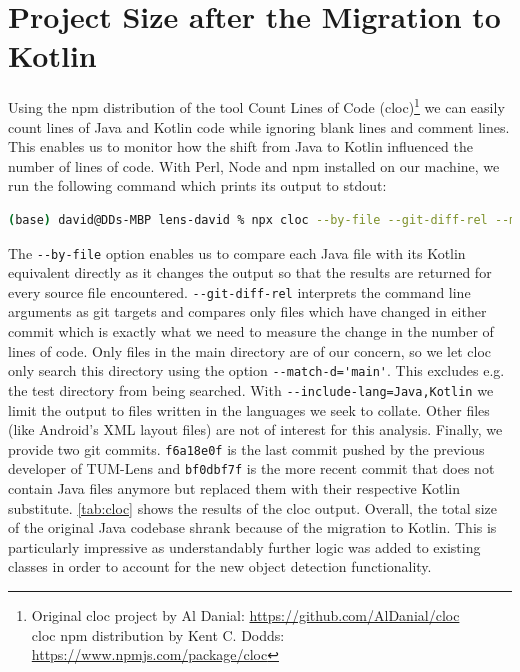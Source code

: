 \documentclass[
			   fontsize=11pt,
               paper=a4,
               bibliography=totoc,
               idxtotoc,
               headsepline,
               footsepline,
               footinclude=false,
               BCOR=12mm,
               DIV=13,
               openany,   %
               oneside    %
               ]
               {scrbook}
\newcommand{\code}[1]{\lstinline[basicstyle = \ttfamily\small]{#1}} %
\begin{document}
\section{Project Size after the Migration to Kotlin} \label{sec:codeSizeAnalysis}

Using the npm distribution of the tool Count Lines of Code (cloc)\footnote{Original cloc project by Al Danial: \url{https://github.com/AlDanial/cloc} \\ cloc npm distribution by Kent C. Dodds: \url{https://www.npmjs.com/package/cloc}} we can easily count lines of Java and Kotlin code while ignoring blank lines and comment lines. This enables us to monitor how the shift from Java to Kotlin influenced the number of lines of code. With Perl, Node and npm installed on our machine, we run the following command which prints its output to stdout:

\begin{lstlisting}[style=standard, language=bash, label=code:cloc, caption={npx cloc command with its options and arguments. Prints the lines of code analysis comapring files before and after the Java to Kotlin conversion. The output was also saved as cloc.csv and can be found in lens-david/thesis/raw\_data.}]
	(base) david@DDs-MBP lens-david % npx cloc --by-file --git-diff-rel --match-d='main' --include-lang=Java,Kotlin -csv f6a18e0f 031a26a7
\end{lstlisting}

\noindent The \code{--by-file} option enables us to compare each Java file with its Kotlin equivalent directly as it changes the output so that the results are returned for every source file encountered. \code{--git-diff-rel} interprets the command line arguments as git targets and compares only files which have changed in either commit which is exactly what we need to measure the change in the number of lines of code. Only files in the main directory are of our concern, so we let cloc only search this directory using the option \code{--match-d='main'}. This excludes e.g. the test directory from being searched. With \code{--include-lang=Java,Kotlin} we limit the output to files written in the languages we seek to collate. Other files (like Android's XML layout files) are not of interest for this analysis. Finally, we provide two git commits. \code{f6a18e0f} is the last commit pushed by the previous developer of TUM-Lens and \code{bf0dbf7f} is the more recent commit that does not contain Java files anymore but replaced them with their respective Kotlin substitute. \autoref{tab:cloc} shows the results of the cloc output. Overall, the total size of the original Java codebase shrank because of the migration to Kotlin. This is particularly impressive as understandably further logic was added to existing classes in order to account for the new object detection functionality.
\end{document}
